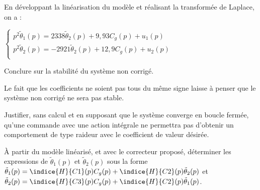 \documentclass[11pt]{article}
\begin{document}
\begin{UPSTIcorrige}
En développant la linéarisation du modèle et réalisant la transformée de Laplace, on a :

$
\left\{
\begin{array}{l}
p^2 \tilde{\theta}_1(p) = 2338 \tilde{\theta}_2(p) + 9,93 C_g(p) + u_1(p) \\
p^2 \tilde{\theta}_2(p) = -2921 \tilde{\theta}_2(p) + 12,9 C_g(p) + u_2(p) \\
\end{array}
\right.
$
\end{UPSTIcorrige}

\UPSTIquestion Conclure sur la stabilité du système non corrigé.
\begin{UPSTIcorrige}
Le fait que les coefficients ne soient pas tous du même signe laisse à penser que le système non corrigé ne sera pas stable.
\end{UPSTIcorrige}

\UPSTIquestion Justifier, sans calcul et en supposant que le système converge en boucle fermée, qu’une commande avec une action intégrale ne permettra pas d’obtenir un comportement de type raideur avec le coefficient de valeur désirée.

\begin{UPSTIcorrige}
\end{UPSTIcorrige}

\UPSTIquestion À partir du modèle linéarisé, et avec le correcteur proposé, déterminer les expressions de
$\tilde{\theta}_1(p)$ et $\tilde{\theta}_2(p)$ sous la forme 
$\tilde{\theta}_1(p)=\indice{H}{C1}(p)C_g(p)+\indice{H}{C2}(p)\tilde{\theta}_2(p)$ et
$\tilde{\theta}_2(p)=\indice{H}{C3}(p)C_g(p)+\indice{H}{C2}(p)\tilde{\theta}_1(p)$.
\end{document}
